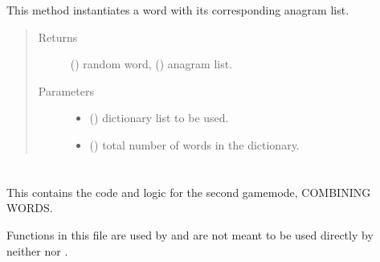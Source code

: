 \documentclass[letterpaper,10pt,english,openany,oneside]{sphinxmanual}
\begin{document}
\begin{fulllineitems}
\label{\detokenize{index:anagram.init_word}}
This method instantiates a word with its corresponding anagram list.
\begin{quote}\begin{description}
\item[{Returns}] \leavevmode
() random word, () anagram list.

\item[{Parameters}] \leavevmode\begin{itemize}
\item {} 
 () \textendash{} dictionary list to be used.

\item {} 
 () \textendash{} total number of words in the dictionary.

\end{itemize}

\end{description}\end{quote}

\end{fulllineitems}



\section{}
\label{\detokenize{index:module-combine}}\label{\detokenize{index:combine-py}}
This contains the code and logic for the
second gamemode, COMBINING WORDS.

Functions in this file are used by 
and are not meant to be used directly by neither
 nor .
\end{document}
